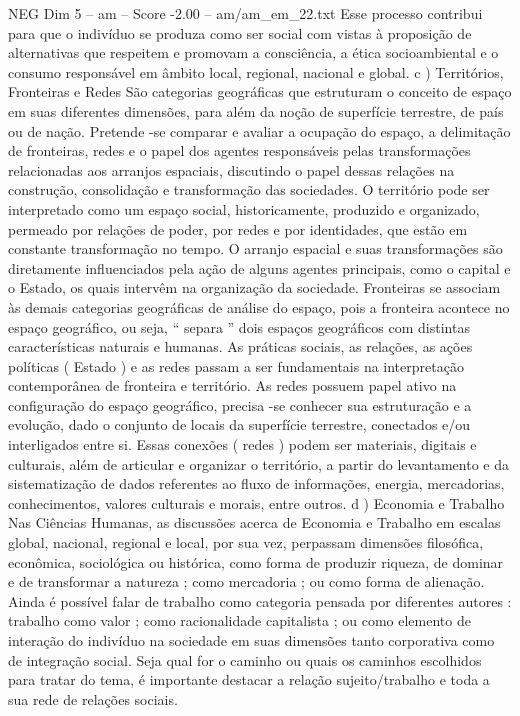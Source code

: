 \begin{textsample}{NEG Dim 5 – am – Score -2.00 – am/am\_em\_22.txt}
Esse processo contribui para que o indivíduo se produza como ser social com vistas à proposição de alternativas que respeitem e promovam a consciência, a ética socioambiental e o consumo responsável em âmbito local, regional, nacional e global. c ) Territórios, Fronteiras e Redes São categorias geográficas que estruturam o conceito de espaço em suas diferentes dimensões, para além da noção de superfície terrestre, de país ou de nação.
Pretende -se comparar e avaliar a ocupação do espaço, a delimitação de fronteiras, redes e o papel dos agentes responsáveis pelas transformações relacionadas aos arranjos espaciais, discutindo o papel dessas relações na construção, consolidação e transformação das sociedades.
O território pode ser interpretado como um espaço social, historicamente, produzido e organizado, permeado por relações de poder, por redes e por identidades, que estão em constante transformação no tempo.
O arranjo espacial e suas transformações são diretamente influenciados pela ação de alguns agentes principais, como o capital e o Estado, os quais intervêm na organização da sociedade.
Fronteiras se associam às demais categorias geográficas de análise do espaço, pois a fronteira acontece no espaço geográfico, ou seja, “ separa ” dois espaços geográficos com distintas características naturais e humanas.
As práticas sociais, as relações, as ações políticas ( Estado ) e as redes passam a ser fundamentais na interpretação contemporânea de fronteira e território.
As redes possuem papel ativo na configuração do espaço geográfico, precisa -se conhecer sua estruturação e a evolução, dado o conjunto de locais da superfície terrestre, conectados e/ou interligados entre si.
Essas conexões ( redes ) podem ser materiais, digitais e culturais, além de articular e organizar o território, a partir do levantamento e da sistematização de dados referentes ao fluxo de informações, energia, mercadorias, conhecimentos, valores culturais e morais, entre outros. d ) Economia e Trabalho Nas Ciências Humanas, as discussões acerca de Economia e Trabalho em escalas global, nacional, regional e local, por sua vez, perpassam dimensões filosófica, econômica, sociológica ou histórica, como forma de produzir riqueza, de dominar e de transformar a natureza ; como mercadoria ; ou como forma de alienação.
Ainda é possível falar de trabalho como categoria pensada por diferentes autores : trabalho como valor ; como racionalidade capitalista ; ou como elemento de interação do indivíduo na sociedade em suas dimensões tanto corporativa como de integração social.
Seja qual for o caminho ou quais os caminhos escolhidos para tratar do tema, é importante destacar a relação sujeito/trabalho e toda a sua rede de relações sociais.

\end{textsample}

